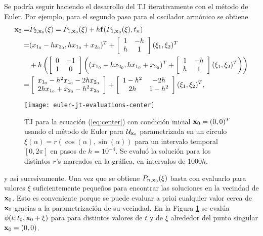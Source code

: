 Se podría seguir haciendo el desarrollo del TJ iterativamente con el método de Euler. Por ejemplo, para el segundo paso para el oscilador armónico se obtiene
\begin{align*}
\mathbf{x}_2 =& P_{2,\mathbf{x}_0}(\xi) = P_{1,\mathbf{x}_0}(\xi) + h \mathbf{f}(P_{1,\mathbf{x}_0}(\xi),t_n) \\
=& (x_{1_0} - h x_{2_0}, h x_{1_0} + x_{2_0} )^T + \left[ \begin{array}{cc}
 1 & -h  \\
h & 1  \\
\end{array} \right] (\xi_1,\xi_2)^T \\ 
&+ h \left( \left[ \begin{array}{cc}
 0 & -1  \\
 1 &  0  \\
\end{array} \right] \left( (x_{1_0} - h x_{2_0}, h x_{1_0} + x_{2_0} )^T + \left[ \begin{array}{cc}
 1 & -h  \\
h & 1  \\
\end{array} \right] (\xi_1,\xi_2)^T \right) \right) \\
=& \left[ \begin{array}{c}
x_{1_0} - h^2x_{1_0} - 2h x_{2_0}  \\
2h x_{1_0} + x_{2_0}  - h^2x_{2_0}  \\
\end{array} \right] + \left[ \begin{array}{cc}
 1-h^2 & -2h  \\
2h & 1-h^2  \\
\end{array} \right] (\xi_1,\xi_2)^T,
\end{align*}
 
\begin{figure}[h!]
 \centering
 \texttt{[image: euler-jt-evaluations-center]}
 \caption{TJ para la ecuación (\ref{eq:center}) con condición inicial $\mathbf{x}_0 = (0,0)^T$ usando el método de Euler para $\mathcal{U}_{\mathbf{x}_0}$ parametrizada en un círculo $\xi(\alpha) = r\left( \cos(\alpha),\sin(\alpha) \right)$ para un intervalo temporal $[0,2\pi]$ en pasos de $h=10^{-4}$. Se evaluó la solución para los distintos $r$'s marcados en la gráfica, en intervalos de $1000h$.}
 \label{fig:center-evals}
\end{figure} 
 
y así sucesivamente. Una vez que se obtiene $P_{n,\mathbf{x}_0}(\xi)$ basta con evaluarlo para valores $\mathbb{\xi}$ suficientemente pequeños para encontrar las soluciones en la vecindad de $\mathbf{x}_0$. Esto es conveniente porque se puede evaluar a prioi cualquier valor cerca de $\mathbf{x}_0$ gracias a la parametrización de su vecindad. En la Figura \ref{fig:center-evals} se evalúa $\phi(t;t_0,\mathbf{x}_0 + \xi)$ para para distintos valores de $t$ y de $\xi$ alrededor del punto singular $\mathbf{x}_0 = (0,0)$.

